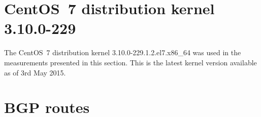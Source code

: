 	

	

	

\section{CentOS~7 distribution kernel 3.10.0-229}
The CentOS~7 distribution kernel 3.10.0-229.1.2.el7.x86\_64
was used in the measurements presented in this section.
This is the latest kernel version available as of 3rd May 2015.


\section{BGP routes}

	
